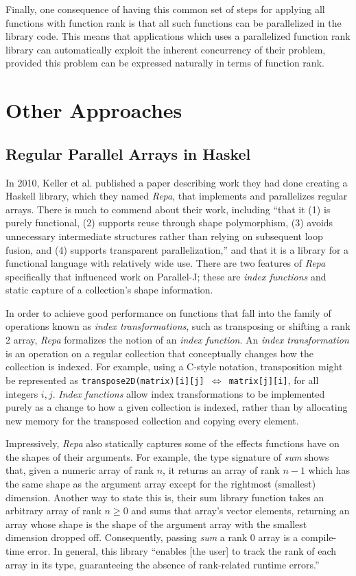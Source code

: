 Finally, one consequence of having this common set of steps for applying all functions with function rank is
that all such functions can be parallelized in the library code.
This means that applications which uses a parallelized function rank library 
can automatically exploit the inherent concurrency of their problem, 
provided this problem can be expressed naturally in terms of function rank.

\section{Other Approaches}
\subsection{Regular Parallel Arrays in Haskel}
\label{repa}
In 2010, Keller et al. published a paper\cite{dph} 
describing work they had done creating a Haskell library, which they named \textit{Repa}, that implements and parallelizes regular arrays.
There is much to commend about their work, including ``that it (1) is purely
functional, (2) supports reuse through shape polymorphism, (3)
avoids unnecessary intermediate structures rather than relying on
subsequent loop fusion, and (4) supports transparent parallelization,''
and that it is a library for a functional language with relatively wide use. 
There are two features of \textit{Repa} specifically 
that influenced work on Parallel-J; 
these are \textit{index functions} and static capture of a collection's shape information.

In order to achieve good performance on functions 
that fall into the family of operations known as \textit{index transformations}, 
such as transposing or shifting a rank 2 array, 
\textit{Repa} formalizes the notion of an \textit{index function}. 
An \textit{index transformation} is an operation on a regular collection that 
conceptually changes how the collection is indexed. 
For example, using a C-style notation, transposition might be represented as 
\texttt{transpose2D(matrix)[i][j] $\Leftrightarrow$ matrix[j][i]}, for all integers $i,j$. 
\textit{Index functions} allow index transformations to be implemented purely as 
a change to how a given collection is indexed, 
rather than by allocating new memory for the transposed collection and copying every element.

Impressively, \textit{Repa} also statically captures some of the effects functions have on the shapes of their arguments.
For example, the type signature of \textit{sum} shows that, given a numeric array of rank $n$, 
it returns an array of rank $n-1$ which has the same shape as the argument array 
except for the rightmost (smallest) dimension.
Another way to state this is, their sum library function takes an arbitrary array of rank $n \ge 0$ 
and sums that array's vector elements, 
returning an array whose shape is the shape of the argument array with the smallest dimension dropped off.
Consequently, passing \textit{sum} a rank 0 array is a compile-time error.
In general, this library ``enables [the user] to track the rank of each array in its type,
guaranteeing the absence of rank-related runtime errors.''

